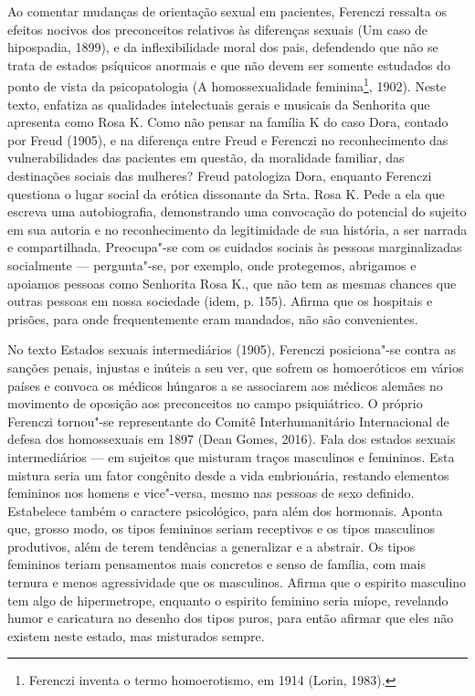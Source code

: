Ao comentar mudanças de orientação sexual em pacientes, Ferenczi
ressalta os efeitos nocivos dos preconceitos relativos às diferenças
sexuais (Um caso de hipospadia, 1899), e da inflexibilidade moral dos
pais, defendendo que não se trata de estados psíquicos anormais e que
não devem ser somente estudados do ponto de vista da psicopatologia (A
homossexualidade feminina\footnote{Ferenczi inventa o termo
  homoerotismo, em 1914 (Lorin, 1983).}, 1902). Neste texto, enfatiza as
qualidades intelectuais gerais e musicais da Senhorita que apresenta
como Rosa K. Como não pensar na família K do caso Dora, contado por
Freud (1905), e na diferença entre Freud e Ferenczi no reconhecimento
das vulnerabilidades das pacientes em questão, da moralidade familiar,
das destinações sociais das mulheres? Freud patologiza Dora, enquanto
Ferenczi questiona o lugar social da erótica dissonante da Srta. Rosa K.
Pede a ela que escreva uma autobiografia, demonstrando uma convocação do
potencial do sujeito em sua autoria e no reconhecimento da legitimidade
de sua história, a ser narrada e compartilhada. Preocupa"-se com os
cuidados sociais às pessoas marginalizadas socialmente --- pergunta"-se,
por exemplo, onde protegemos, abrigamos e apoiamos pessoas como
Senhorita Rosa K., que não tem as mesmas chances que outras pessoas em
nossa sociedade (idem, p. 155). Afirma que os hospitais e prisões, para
onde frequentemente eram mandados, não são convenientes.

No texto Estados sexuais intermediários (1905), Ferenczi posiciona"-se
contra as sanções penais, injustas e inúteis a seu ver, que sofrem os
homoeróticos em vários países e convoca os médicos húngaros a se
associarem aos médicos alemães no movimento de oposição aos preconceitos
no campo psiquiátrico. O próprio Ferenczi tornou"-se representante do
Comitê Interhumanitário Internacional de defesa dos homossexuais em 1897
(Dean Gomes, 2016). Fala dos estados sexuais intermediários --- em
sujeitos que misturam traços masculinos e femininos. Esta mistura seria
um fator congênito desde a vida embrionária, restando elementos
femininos nos homens e vice"-versa, mesmo nas pessoas de sexo definido.
Estabelece também o caractere psicológico, para além dos hormonais.
Aponta que, grosso modo, os tipos femininos seriam receptivos e os tipos
masculinos produtivos, além de terem tendências a generalizar e a
abstrair. Os tipos femininos teriam pensamentos mais concretos e senso
de família, com mais ternura e menos agressividade que os masculinos.
Afirma que o espirito masculino tem algo de hipermetrope, enquanto o
espirito feminino seria míope, revelando humor e caricatura no desenho
dos tipos puros, para então afirmar que eles não existem neste estado,
mas misturados sempre.

